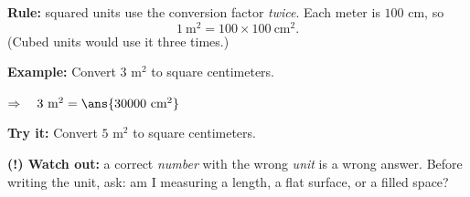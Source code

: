 \documentclass[12pt]{article}
\begin{document}

\begin{formulabox}
\textbf{Rule:} \quad squared units use the conversion factor \emph{twice}.
Each meter is $100$ cm, so
\[ 1\ \text{m}^2 = 100 \times 100\ \text{cm}^2 . \]
(Cubed units would use it three times.)
\end{formulabox}

\begin{examplebox}
\textbf{Example:} \quad Convert $3$ m$^2$ to square centimeters.

$\Rightarrow\quad 3\ \text{m}^2 = \ans{30000\ \text{cm}^2}$
\end{examplebox}

\begin{tryitbox}
\textbf{Try it:} \quad Convert $5$ m$^2$ to square centimeters.\\[2pt]
\end{tryitbox}

\begin{watchoutbox}
\textbf{(!) Watch out:} a correct \emph{number} with the wrong \emph{unit}
is a wrong answer. Before writing the unit, ask: am I measuring a length, a
flat surface, or a filled space?
\end{watchoutbox}
\end{document}
